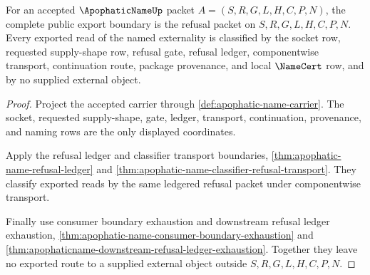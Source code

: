 \begin{theorem}
\label{thm:apophatic-name-refusal-export-totality}
For an accepted $\ApophaticNameUp$ packet $A=(S,R,G,L,H,C,P,N)$, the complete public export boundary is the refusal packet on $S,R,G,L,H,C,P,N$. Every exported read of the named externality is classified by the socket row, requested supply-shape row, refusal gate, refusal ledger, componentwise transport, continuation route, package provenance, and local $\NameCert$ row, and by no supplied external object.
\end{theorem}
\begin{proof}
Project the accepted carrier through \autoref{def:apophatic-name-carrier}. The socket, requested supply-shape, gate, ledger, transport, continuation, provenance, and naming rows are the only displayed coordinates.

Apply the refusal ledger and classifier transport boundaries, \autoref{thm:apophatic-name-refusal-ledger} and \autoref{thm:apophatic-name-classifier-refusal-transport}. They classify exported reads by the same ledgered refusal packet under componentwise transport.

Finally use consumer boundary exhaustion and downstream refusal ledger exhaustion, \autoref{thm:apophatic-name-consumer-boundary-exhaustion} and \autoref{thm:apophaticname-downstream-refusal-ledger-exhaustion}. Together they leave no exported route to a supplied external object outside $S,R,G,L,H,C,P,N$.
\end{proof}

